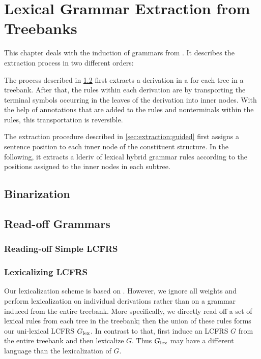 \documentclass[../document.tex]{subfiles}
\begin{document}
    \chapter{Lexical Grammar Extraction from Treebanks}
    This chapter deals with the induction of  grammars from .
    It describes the extraction process in two different orders:
    \begin{compactenum}
        \item
            The process described in \cref{sec:extraction:readoff} first extracts a derivation in a   for each tree in a treebank.
            After that, the rules within each derivation are  by transporting the terminal symbols occurring in the leaves of the derivation into inner nodes.
            With the help of annotations that are added to the rules and nonterminals within the rules, this transportation is reversible.
        \item
            The extraction procedure described in \cref{sec:extraction:guided} first assigns a sentence position to each inner node of the constituent structure.
            In the following, it extracts a \gls{lderiv} of lexical hybrid grammar rules according to the positions assigned to the inner nodes in each subtree.
    \end{compactenum}

    \section{Binarization}


    \section{Read-off Grammars} \label{sec:extraction:readoff}

    \subsection{Reading-off Simple LCFRS}

    \subsection{Lexicalizing LCFRS}
    Our lexicalization scheme is based on \citet{MoeRup20}.
    However, we ignore all weights and perform lexicalization on individual derivations rather than on a grammar induced from the entire treebank.
    More specifically, we directly read off a set of lexical rules from each tree in the treebank; then the union of these rules forms our uni-lexical LCFRS $G_{\mathrm{lex}}$.
    In contrast to that, \citet{MoeRup20} first induce an LCFRS $G$ from the entire treebank and then lexicalize $G$.
    Thus $G_{\mathrm{lex}}$ may have a different language than the lexicalization of $G$.
\end{document}
